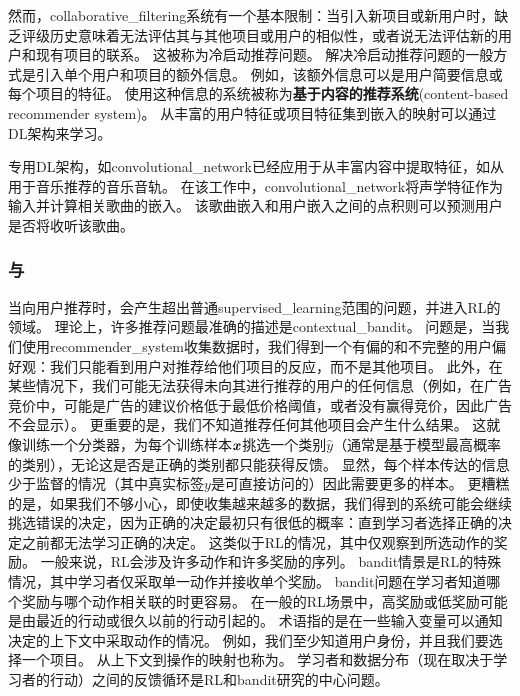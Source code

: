 然而，\gls{collaborative_filtering}系统有一个基本限制：当引入新项目或新用户时，缺乏评级历史意味着无法评估其与其他项目或用户的相似性，或者说无法评估新的用户和现有项目的联系。
这被称为冷启动推荐问题。
解决冷启动推荐问题的一般方式是引入单个用户和项目的额外信息。
例如，该额外信息可以是用户简要信息或每个项目的特征。
使用这种信息的系统被称为\textbf{基于内容的推荐系统}(content-based recommender system)。
从丰富的用户特征或项目特征集到嵌入的映射可以通过\gls{DL}架构来学习\citep{Huang-et-al-2013,Elkahky-et-al-2015}。

专用\gls{DL}架构，如\gls{convolutional_network}已经应用于从丰富内容中提取特征，如从用于音乐推荐的音乐音轨\citep{vandenOord-et-al-NIPS2013}。
在该工作中，\gls{convolutional_network}将声学特征作为输入并计算相关歌曲的嵌入。
该歌曲嵌入和用户嵌入之间的点积则可以预测用户是否将收听该歌曲。


\subsubsection{与}
当向用户推荐时，会产生超出普通\gls{supervised_learning}范围的问题，并进入\gls{RL}的领域。
理论上，许多推荐问题最准确的描述是\gls{contextual_bandit}\citep{Langford+Zhang-NIPS2008,Lu-et-al-2010}。
问题是，当我们使用\gls{recommender_system}收集数据时，我们得到一个有偏的和不完整的用户偏好观：我们只能看到用户对推荐给他们项目的反应，而不是其他项目。
此外，在某些情况下，我们可能无法获得未向其进行推荐的用户的任何信息（例如，在广告竞价中，可能是广告的建议价格低于最低价格阈值，或者没有赢得竞价，因此广告不会显示）。
更重要的是，我们不知道推荐任何其他项目会产生什么结果。
这就像训练一个分类器，为每个训练样本$\boldsymbol{\mathit{x}}$挑选一个类别$\hat y$（通常是基于模型最高概率的类别），无论这是否是正确的类别都只能获得反馈。
显然，每个样本传达的信息少于监督的情况（其中真实标签$y$是可直接访问的）因此需要更多的样本。
更糟糕的是，如果我们不够小心，即使收集越来越多的数据，我们得到的系统可能会继续挑选错误的决定，因为正确的决定最初只有很低的概率：直到学习者选择正确的决定之前都无法学习正确的决定。
这类似于\gls{RL}的情况，其中仅观察到所选动作的奖励。
一般来说，\gls{RL}会涉及许多动作和许多奖励的序列。
\gls{bandit}情景是\gls{RL}的特殊情况，其中学习者仅采取单一动作并接收单个奖励。
\gls{bandit}问题在学习者知道哪个奖励与哪个动作相关联的时更容易。
在一般的\gls{RL}场景中，高奖励或低奖励可能是由最近的行动或很久以前的行动引起的。
术语指的是在一些输入变量可以通知决定的上下文中采取动作的情况。
例如，我们至少知道用户身份，并且我们要选择一个项目。
从上下文到操作的映射也称为。
学习者和数据分布（现在取决于学习者的行动）之间的反馈循环是\gls{RL}和\gls{bandit}研究的中心问题。

